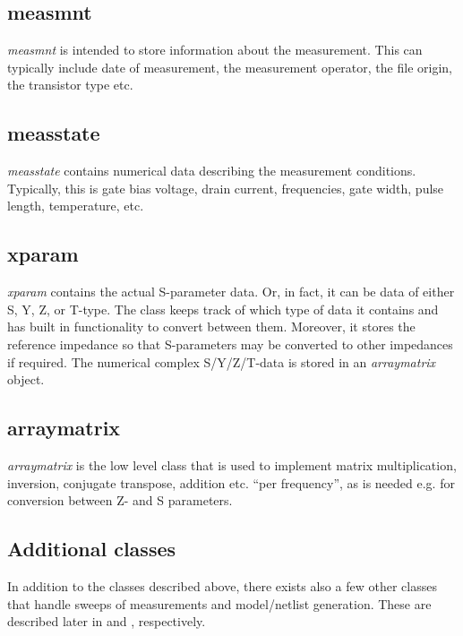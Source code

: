 \subsection{measmnt}
\emph{measmnt} is intended to store information about the
measurement. This can typically include date of measurement, the
measurement operator, the file origin, the transistor type etc.

\subsection{measstate}
\emph{measstate} contains numerical data describing the
measurement conditions. Typically, this is gate bias voltage,
drain current, frequencies, gate width, pulse length, temperature,
etc.

\subsection{xparam}
\emph{xparam} contains the actual S-parameter data. Or, in fact,
it can be data of either S, Y, Z, or T-type. The class keeps track
of which type of data it contains and has built in functionality
to convert between them. Moreover, it stores the reference
impedance so that S-parameters may be converted to other
impedances if required. The numerical complex S/Y/Z/T-data is
stored in an \emph{arraymatrix} object.

\subsection{arraymatrix}
\emph{arraymatrix} is the low level class that is used to
implement matrix multiplication, inversion, conjugate transpose,
addition etc. ``per frequency'', as is needed e.g. for conversion
between Z- and S parameters.

\subsection{Additional classes}
In addition to the classes described above, there exists also a
few other classes that handle sweeps of measurements and
model/netlist generation. These are described later in
 and , respectively.
